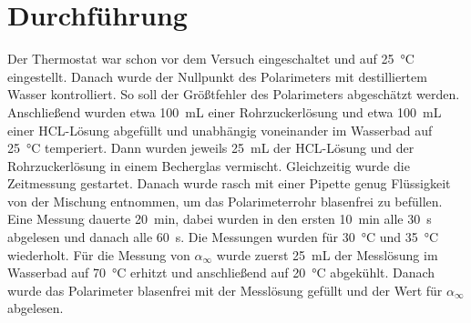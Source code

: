 \section{Durchführung}
Der Thermostat war schon vor dem Versuch eingeschaltet und auf \qty{25}{\degreeCelsius} eingestellt. 
Danach wurde der Nullpunkt des Polarimeters mit destilliertem Wasser kontrolliert. 
So soll der Größtfehler des Polarimeters abgeschätzt werden.
Anschließend wurden etwa \qty{100}{\milli\liter} einer Rohrzuckerlösung und etwa \qty{100}{\milli\liter} einer HCL-Lösung abgefüllt und unabhängig voneinander im Wasserbad auf \qty{25}{\degreeCelsius} temperiert. 
Dann wurden jeweils \qty{25}{\milli\liter} der HCL-Lösung und der Rohrzuckerlösung in einem Becherglas vermischt. 
Gleichzeitig wurde die Zeitmessung gestartet. 
Danach wurde rasch mit einer Pipette genug Flüssigkeit von der Mischung entnommen, um das Polarimeterrohr blasenfrei zu befüllen. 
Eine Messung dauerte \qty{20}{\minute}, dabei wurden in den ersten \qty{10}{\minute} alle \qty{30}{\second} abgelesen und danach alle \qty{60}{\second}. 
Die Messungen wurden für \qty{30}{\degreeCelsius} und \qty{35}{\degreeCelsius} wiederholt. 
Für die Messung von $\alpha_\infty$ wurde zuerst \qty{25}{\milli\liter} der Messlösung  im Wasserbad auf \qty{70}{\degreeCelsius} erhitzt und anschließend auf \qty{20}{\degreeCelsius} abgekühlt. 
Danach wurde das Polarimeter blasenfrei mit der Messlösung gefüllt und der Wert für $\alpha_\infty$ abgelesen.
